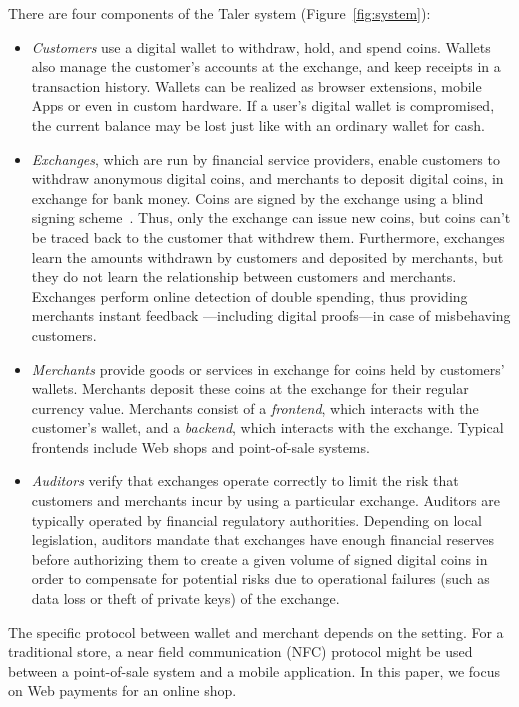 \documentclass{IEEEtran}
\begin{document}
There are four components of the Taler system (Figure~\ref{fig:system}):

\begin{itemize}
\item
{\em Customers} use a digital wallet to withdraw,
hold, and spend coins. Wallets also manage the customer's accounts
at the exchange, and keep receipts in a transaction history.  Wallets can be
realized as browser extensions, mobile Apps or even in custom
hardware.  If a user's digital wallet is compromised, the current
balance may be lost just like with an ordinary wallet for cash.

\item
{\em Exchanges}, which are run by financial service providers, enable
customers to withdraw anonymous digital coins,
and merchants to deposit digital coins, in exchange for
bank money.  Coins are signed by the exchange using
a blind signing scheme~\cite{chaum1983blind}.  Thus, only
the exchange can issue new coins, but coins can't be traced back
to the customer that withdrew them.
Furthermore, exchanges learn the amounts withdrawn by customers
and deposited by merchants, but they do not learn the relationship
between customers and merchants.  Exchanges perform online detection
of double spending, thus providing merchants instant feedback
---including digital proofs---in case of misbehaving customers.

\item
{\em Merchants} provide goods or services in exchange for coins held
by customers' wallets.  Merchants deposit these coins at the
exchange for their regular currency value.  Merchants consist of a
{\em frontend}, which interacts with the customer's wallet, and a {\em
backend}, which interacts with the exchange.  Typical frontends include
Web shops and point-of-sale systems.

\item
{\em Auditors} verify that exchanges operate correctly to limit the risk
that customers and merchants incur by using a particular exchange.
Auditors are typically operated by financial regulatory authorities.
Depending on local legislation, auditors mandate that exchanges
have enough financial reserves before authorizing them to create a given
volume of signed digital coins in order to compensate for potential risks due to
operational failures (such as data loss or theft of private keys) of the exchange.
\end{itemize}

The specific protocol between wallet and merchant depends on the
setting.  For a traditional store, a near field communication (NFC) protocol might be used
between a point-of-sale system and a mobile application.  In this
paper, we focus on Web payments for an online shop.
\end{document}
